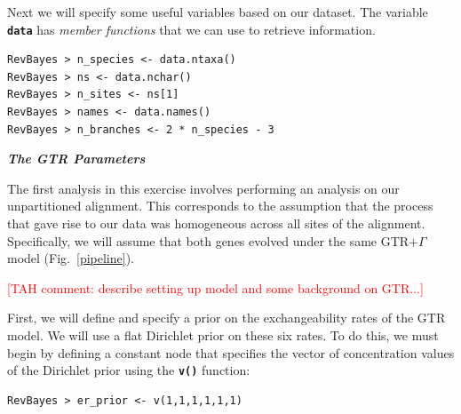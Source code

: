 \documentclass[11pt]{article}
\newcommand{\taha}[1]{{\textcolor{red}{[TAH comment: #1]}}} %
\newcommand{\cl}[1]{{\texttt{\textbf{#1}}}}
\newcommand{\mbcl}[1]{\exs{\cl{MrBayes > {#1}}}}
\begin{document}
Next we will specify some useful variables based on our dataset. The variable \cl{data} has \textit{member functions} that we can use to retrieve information. 
{\tt \begin{snugshade*}
\begin{lstlisting}
RevBayes > n_species <- data.ntaxa()
RevBayes > ns <- data.nchar()
RevBayes > n_sites <- ns[1] 
RevBayes > names <- data.names()	
RevBayes > n_branches <- 2 * n_species - 3 
\end{lstlisting}
\end{snugshade*}}

\textbf{\textit{The GTR Parameters}}

The first analysis in this exercise involves performing an analysis on our unpartitioned alignment. 
This corresponds to the assumption that the process that gave rise to our data was homogeneous across all sites of the alignment. 
Specifically, we will assume that both genes evolved under the same GTR$+\Gamma$ model (Fig.~\ref{pipeline}). 

\taha{describe setting up model and some background on GTR...}


%
%
%

First, we will define and specify a prior on the exchangeability rates of the GTR model. We will use a flat Dirichlet prior on these six rates. To do this, we must begin by defining a constant node that specifies the vector of concentration values of the Dirichlet prior using the \cl{v()} function:
{\tt \begin{snugshade*}
\begin{lstlisting}
RevBayes > er_prior <- v(1,1,1,1,1,1) 
\end{lstlisting}
\end{snugshade*}}
\end{document}
